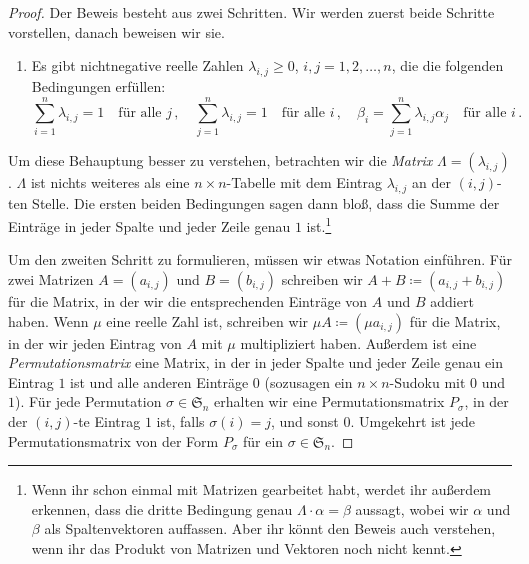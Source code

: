 \begin{proof}
	Der Beweis besteht aus zwei Schritten. Wir werden zuerst beide Schritte vorstellen, danach beweisen wir sie.
	\begin{enumerate}[label=\textup{(\arabic*)},ref=\textup{(\arabic*)}]\itshape
		\item Es gibt nichtnegative reelle Zahlen $\lambda_{i,j}\geqslant 0$, $i,j=1,2,\dotsc,n$, die die folgenden Bedingungen erfüllen:\label{behauptung:DoppeltStochastischeMatrix}
		\begin{equation*}
			\sum_{i=1}^n\lambda_{i,j}=1\quad\text{für alle $j$}\,,\quad \sum_{j=1}^n\lambda_{i,j}=1\quad\text{für alle $i$}\,,\quad \beta_i=\sum_{j=1}^n\lambda_{i,j}\alpha_j\quad\text{für alle $i$}\,.
		\end{equation*}
	\end{enumerate}
	Um diese Behauptung besser zu verstehen, betrachten wir die \emph{Matrix} $\Lambda=(\lambda_{i,j})$. $\Lambda$ ist nichts weiteres als eine $n\times n$-Tabelle mit dem Eintrag $\lambda_{i,j}$ an der $(i,j)$-ten Stelle. Die ersten beiden Bedingungen sagen dann bloß, dass die Summe der Einträge in jeder Spalte und jeder Zeile genau $1$ ist.\footnote{Wenn ihr schon einmal mit Matrizen gearbeitet habt, werdet ihr außerdem erkennen, dass die dritte Bedingung genau $\Lambda\cdot\alpha=\beta$ aussagt, wobei wir $\alpha$ und $\beta$ als Spaltenvektoren auffassen. Aber ihr könnt den Beweis auch verstehen, wenn ihr das Produkt von Matrizen und Vektoren noch nicht kennt.}
	
	Um den zweiten Schritt zu formulieren, müssen wir etwas Notation einführen. Für zwei Matrizen $A=(a_{i,j})$ und $B=(b_{i,j})$ schreiben wir $A+B\coloneqq (a_{i,j}+b_{i,j})$ für die Matrix, in der wir die entsprechenden Einträge von $A$ und $B$ addiert haben. Wenn $\mu$ eine reelle Zahl ist, schreiben wir $\mu A\coloneqq (\mu a_{i,j})$ für die Matrix, in der wir jeden Eintrag von $A$ mit $\mu$ multipliziert haben. Außerdem ist eine \emph{Permutationsmatrix} eine Matrix, in der in jeder Spalte und jeder Zeile genau ein Eintrag $1$ ist und alle anderen Einträge $0$ (sozusagen ein \glqq $n\times n$-Sudoku mit $0$ und $1$\grqq). Für jede Permutation $\sigma\in\mathfrak S_n$ erhalten wir eine Permutationsmatrix $P_\sigma$, in der der $(i,j)$-te Eintrag $1$ ist, falls $\sigma(i)=j$, und sonst $0$. Umgekehrt ist jede Permutationsmatrix von der Form $P_\sigma$ für ein $\sigma\in\mathfrak S_n$.
	

\end{proof}
